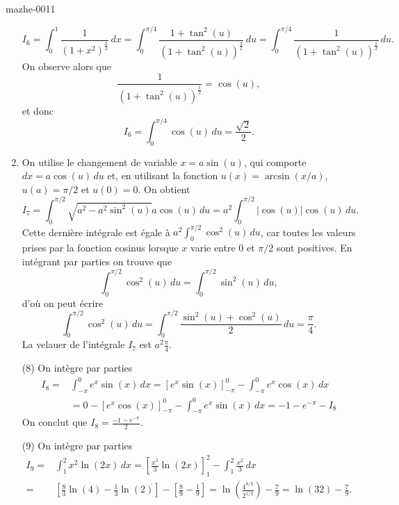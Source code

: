\begin{corrige}{mazhe-0011}
\begin{enumerate}
    \[
    I_{6}=\int_{0}^{1}\frac{1}{(1+x^2)^{\frac{3}{2}}}\, dx  = \int_{0}^{\pi/4}\frac{1+\tan^2(u)}{(1+\tan^2(u))^{\frac{3}{2}}}\, du= \int_{0}^{\pi/4}\frac{1}{(1+\tan^2(u))^{\frac{1}{2}}}\, du.
    \]
    On observe alors que 
    \[
    \frac{1}{(1+\tan^2(u))^{\frac{1}{2}}} = \cos(u),
    \]
    et donc 
    \[
    I_{6}= \int_{0}^{\pi/4}\cos(u)\, du = \frac{\sqrt{2}}{2}.
    \]
  \item On utilise le changement de variable $x = a\sin(u)$, qui comporte $dx = a\cos(u)\,du$ et, en utilisant la fonction $u(x) = \arcsin(x/a)$, $u(a) = \pi/2$  et  $u(0) = 0$. On obtient
\[
 I_{7}=\int_{0}^{\pi/2}\sqrt{a^2-a^2\sin^2(u)} a\cos(u)\, du = a^2\int_{0}^{\pi/2} |\cos(u)|\cos(u)\, du.
\]
Cette dernière intégrale est égale à $\displaystyle a^2\int_{0}^{\pi/2} \cos^2(u)\, du$, car toutes les valeurs prises par la fonction cosinus lorsque $x$ varie entre $0$ et $\pi/2$ sont positives. En intégrant par parties on trouve que 
 \[
\int_{0}^{\pi/2} \cos^2(u)\, du =\int_{0}^{\pi/2} \sin^2(u)\, du,
\]
d'où on peut écrire 
 \[
\int_{0}^{\pi/2} \cos^2(u)\, du =\int_{0}^{\pi/2} \frac{\sin^2(u) +\cos^2(u)}{2}\, du = \frac{\pi}{4}.
\]
La velauer de l'intégrale $ I_{7}$ est $a^2\frac{\pi}{4}$.
    \item[(8)]  On intègre par parties 
      \begin{equation*}
        \begin{aligned}
           I_{8}=&\int_{-\pi}^{0} e^x\sin(x) \, dx =  \left[e^x\sin(x)\right]_{-\pi}^{0}-\int_{-\pi}^{0} e^x\cos(x) \, dx \\
           &= 0 -\left[e^x\cos(x)\right]_{-\pi}^{0}-\int_{-\pi}^{0} e^x\sin(x) \, dx = -1-e^{-\pi}-I_{8}
           \end{aligned}
      \end{equation*}
      On conclut que $I_{8} = \frac{-1-e^{-\pi}}{2}$.
    \item[(9)]  On intègre par parties 
      \begin{equation*}
        \begin{aligned}
      I_{9}=&\int_{1}^{2} x^2\ln(2x) \, dx = \left[\frac{x^3}{3}\ln(2x)\right]_{1}^{2} - \int_{1}^{2} \frac{x^2}{3} \, dx \\
      =& \left[\frac{8}{3}\ln(4) - \frac{1}{3}\ln(2)\right] -\left[\frac{8}{9}-\frac{1}{9}\right] = \ln\left(\frac{4^{8/3}}{2^{1/3}}\right)-\frac{7}{9} =\ln\left(32\right)-\frac{7}{9}.  
        \end{aligned}
      \end{equation*}
     

\end{enumerate}
\end{corrige}

